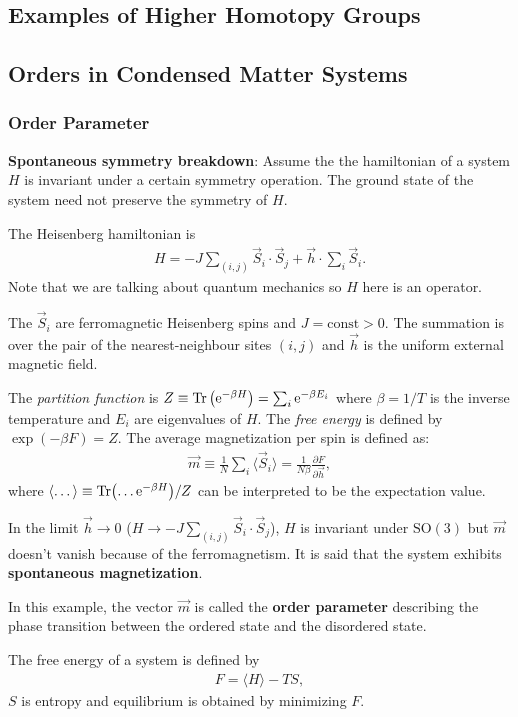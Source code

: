 \documentclass[10pt]{article}
\begin{document}
\subsection{Examples of Higher Homotopy Groups}
\subsection{Orders in Condensed Matter Systems}
\subsubsection{Order Parameter}
\textbf{Spontaneous symmetry breakdown}: Assume the the hamiltonian of a system $H$ is invariant under a certain symmetry operation.
The ground state of the system need not preserve the symmetry of $H$.
\begin{example}
    The Heisenberg hamiltonian is
    \begin{align}
        H=-J\sum_{(i,j)}\vec{S}_i\cdot\vec{S}_j+\vec{h}\cdot\sum_i \vec{S}_i.
    \end{align}
    Note that we are talking about quantum mechanics so $H$ here is an operator.

    The $\vec{S}_i$ are ferromagnetic Heisenberg spins and $J=\text{const}>0$.
    The summation is over the pair of the nearest-neighbour sites $(i,j)$ and $\vec{h}$ is the uniform external magnetic field.

    The \textit{partition function} is $Z\equiv\Tr\left(\text{e}^{-\beta H}\right)=\sum_i \mathrm{e}^{-\beta E_i}$ where $\beta=1/T$ is the inverse temperature and $E_i$ are eigenvalues of $H$.
    The \textit{free energy} is defined by $\exp(-\beta F)=Z$.
    The average magnetization per spin is defined as:
    \begin{align}
        \vec{m}\equiv\frac{1}{N}\sum_{i}\langle\vec{S}_i\rangle=\frac{1}{N\beta}\frac{\partial F}{\partial \vec{h}},
    \end{align}
    where $\langle\dots\rangle\equiv\Tr(\dots \text{e}^{-\beta H})/Z$ can be interpreted to be the expectation value.

    In the limit $\vec{h}\rightarrow 0$ ($H\rightarrow -J\sum_{(i,j)}\vec{S}_i\cdot\vec{S}_j$), $H$ is invariant under $\text{SO}(3)$ but $\vec{m}$ doesn't vanish because of the ferromagnetism.
    It is said that the system exhibits \textbf{spontaneous magnetization}.

    In this example, the vector $\vec{m}$ is called the \textbf{order parameter} describing the phase transition between the ordered state and the disordered state.
\end{example}
The free energy of a system is defined by
\begin{align}
    F=\langle H\rangle-TS,
\end{align}
$S$ is entropy and equilibrium is obtained by minimizing $F$.
\end{document}
